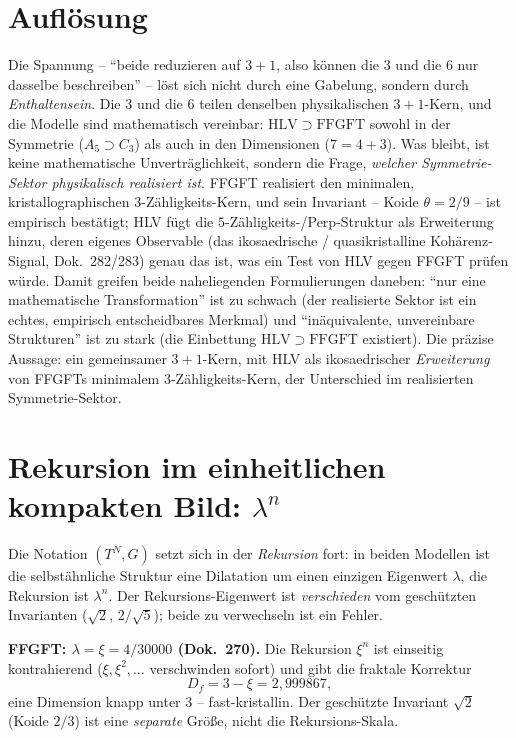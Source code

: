 \section{Auflösung}
Die Spannung -- ``beide reduzieren auf $3{+}1$, also können die $3$ und die $6$ nur dasselbe
beschreiben'' -- löst sich nicht durch eine Gabelung, sondern durch \emph{Enthaltensein}.
Die $3$ und die $6$ teilen denselben physikalischen $3{+}1$-Kern, und die Modelle sind
mathematisch vereinbar: $\mathrm{HLV}\supset\mathrm{FFGFT}$ sowohl in der Symmetrie
($A_5\supset C_3$) als auch in den Dimensionen ($7=4+3$). Was bleibt, ist keine
mathematische Unverträglichkeit, sondern die Frage, \emph{welcher Symmetrie-Sektor
physikalisch realisiert ist}. FFGFT realisiert den minimalen, kristallographischen
$3$-Zähligkeits-Kern, und sein Invariant -- Koide $\theta=2/9$ -- ist empirisch bestätigt;
HLV fügt die $5$-Zähligkeits-/Perp-Struktur als Erweiterung hinzu, deren eigenes
Observable (das ikosaedrische / quasikristalline Kohärenz-Signal, Dok.~282/283) genau das
ist, was ein Test von HLV gegen FFGFT prüfen würde. Damit greifen beide naheliegenden
Formulierungen daneben: ``nur eine mathematische Transformation'' ist zu schwach (der
realisierte Sektor ist ein echtes, empirisch entscheidbares Merkmal) und ``inäquivalente,
unvereinbare Strukturen'' ist zu stark (die Einbettung $\mathrm{HLV}\supset\mathrm{FFGFT}$
existiert). Die präzise Aussage: ein gemeinsamer $3{+}1$-Kern, mit HLV als ikosaedrischer
\emph{Erweiterung} von FFGFTs minimalem $3$-Zähligkeits-Kern, der Unterschied im
realisierten Symmetrie-Sektor.

\section{Rekursion im einheitlichen kompakten Bild: $\lambda^n$}
Die Notation $(T^N,G)$ setzt sich in der \emph{Rekursion} fort: in beiden Modellen ist die
selbst\"ahnliche Struktur eine Dilatation um einen einzigen Eigenwert $\lambda$, die
Rekursion ist $\lambda^n$. Der Rekursions-Eigenwert ist \emph{verschieden} vom gesch\"utzten
Invarianten ($\sqrt2$, $2/\sqrt5$); beide zu verwechseln ist ein Fehler.

\textbf{FFGFT: $\lambda=\xi=4/30000$ (Dok.~270).} Die Rekursion $\xi^n$ ist einseitig
kontrahierend ($\xi,\xi^2,\dots$ verschwinden sofort) und gibt die fraktale Korrektur
\begin{equation}
D_f = 3-\xi = 2{,}999867,
\end{equation}
eine Dimension knapp unter $3$ -- fast-kristallin. Der gesch\"utzte Invariant $\sqrt2$ (Koide
$2/3$) ist eine \emph{separate} Gr\"o\ss e, nicht die Rekursions-Skala.

